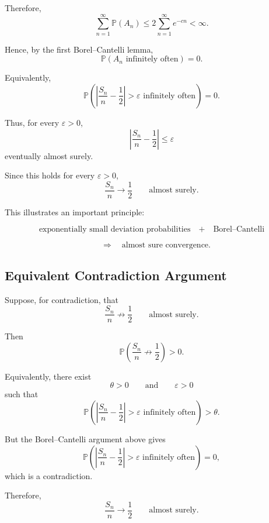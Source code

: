 Therefore,
\[
\sum_{n=1}^{\infty}\mathbb{P}(A_n)
\leq
2\sum_{n=1}^{\infty}e^{-cn}
<\infty.
\]

Hence, by the first Borel--Cantelli lemma,
\[
\mathbb{P}(A_n\text{ infinitely often})=0.
\]

Equivalently,
\[
\mathbb{P}
\left(
\left|
\frac{S_n}{n}-\frac12
\right|
>\varepsilon
\text{ infinitely often}
\right)
=0.
\]

Thus, for every $\varepsilon>0$,
\[
\left|
\frac{S_n}{n}-\frac12
\right|
\leq\varepsilon
\]
eventually almost surely.

Since this holds for every $\varepsilon>0$,
\[
\boxed{
\frac{S_n}{n}
\longrightarrow
\frac12
\qquad\text{almost surely}.
}
\]

\begin{observation}

This illustrates an important principle:

\[
\text{exponentially small deviation probabilities}
\quad+\quad
\text{Borel--Cantelli}
\]

\[\quad\Longrightarrow\quad
\text{almost sure convergence}.
\]

\end{observation}



\subsection{Equivalent Contradiction Argument}

Suppose, for contradiction, that
\[
\frac{S_n}{n}
\not\longrightarrow
\frac12
\qquad\text{almost surely}.
\]

Then
\[
\mathbb{P}
\left(
\frac{S_n}{n}
\not\longrightarrow
\frac12
\right)
>0.
\]

Equivalently, there exist
\[
\theta>0
\qquad\text{and}\qquad
\varepsilon>0
\]
such that
\[
\mathbb{P}
\left(
\left|
\frac{S_n}{n}-\frac12
\right|
>\varepsilon
\text{ infinitely often}
\right)
>\theta.
\]

But the Borel--Cantelli argument above gives
\[
\mathbb{P}
\left(
\left|
\frac{S_n}{n}-\frac12
\right|
>\varepsilon
\text{ infinitely often}
\right)
=0,
\]
which is a contradiction.

Therefore,
\[
\boxed{
\frac{S_n}{n}
\longrightarrow
\frac12
\qquad\text{almost surely}.
}
\]






\lectureend
